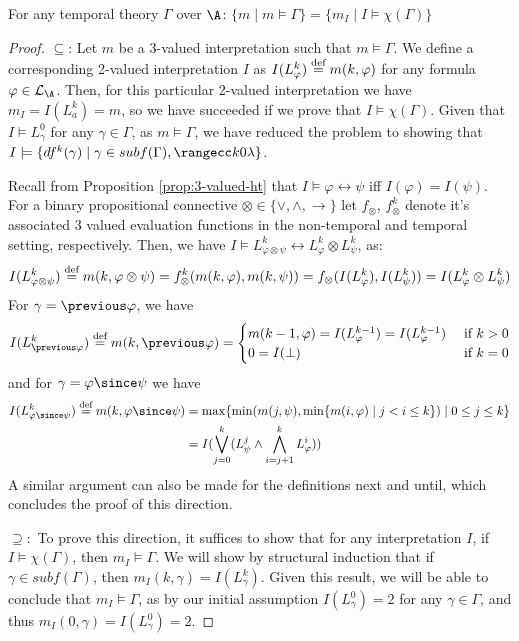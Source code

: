 \begin{theorem}\label{theorem:translation}
For any temporal theory $\Gamma$ over $\A$: \quad
$\{ m \mid m \models \Gamma \} = \{ m_I \mid I \models \chi(\Gamma) \}$
\end{theorem}
\begin{proof}
  $\subseteq$: Let $m$ be a 3-valued interpretation such that
  $m \models \Gamma$. We define a corresponding 2-valued
  interpretation $I$ as $I(L^k_\varphi) \stackrel{\text{def}}{=} m(k,\varphi)$ for any
  formula $\varphi \in \mathcal{L}_\A$. Then, for this particular
  2-valued interpretation we have $m_I=I(L_a^k)=m$, so we have
  succeeded if we prove that $I \models \chi(\Gamma)$. Given that
  $I \models L^0_\gamma$ for any $\gamma \in \Gamma$, as
  $m \models \Gamma$, we have reduced the problem to showing that
  $I \models \{ df^k(\gamma) \mid \gamma \in subf(\Gamma), \kinlambda
  \}$.

  Recall from Proposition \ref{prop:3-valued-ht} that
  $I \models \varphi \leftrightarrow \psi$ iff $I(\varphi) =
  I(\psi)$. For a binary propositional connective
  $\otimes \in \{ \vee, \wedge, \rightarrow \}$ let $f_{\otimes}$,
  $f_{\otimes}^k$ denote it's associated 3 valued evaluation functions
  in the non-temporal and temporal setting, respectively. Then, we
  have
  $I \models L^k_{\varphi \otimes \psi} \leftrightarrow L^k_\varphi
  \otimes L^k_\psi$, as:
  $$
  I(L^k_{\varphi \otimes \psi}) \stackrel{\text{def}}{=} m(k,\varphi \otimes \psi) 
  = f_{\otimes}^k(m(k,\varphi),m(k,\psi)) = f_{\otimes}(I(L^k_\varphi),I(L^k_\psi)) = I(L^k_{\varphi} \otimes L^k_{\psi})
  $$
  For $\gamma=\previous \varphi$, we have
  $$
  I(L^k_{\previous \varphi}) \defeq m(k,\previous \varphi) = \begin{cases}
    m(k-1,\varphi)=I(L^{k-1}_\varphi)=I(L^{k-1}_\varphi) &\text{ if } k > 0\\
    0=I(\bot) &\text{ if } k = 0
    \end{cases}
  $$
  and for $\gamma=\varphi \since \psi$ we have
  \begin{align*}
  I(L^k_{\varphi \since \psi}) \defeq m(k,\varphi \since \psi) &= \max \{\min (m(j, \psi), \min \{m(i, \varphi) \mid j<i \leq k\}) \mid 0 \leq j \leq k\} \\
    &= I(\bigvee_{j=0}^{k}(L_\psi^j \wedge \bigwedge_{i=j+1}^{k}L_{\varphi}^i))
  \end{align*}
  A similar argument can also be made for the definitions next and
  until, which concludes the proof of this direction.

  $\supseteq:$ To prove this direction, it suffices to show that for
  any interpretation $I$, if $I \models \chi(\Gamma)$, then
  $m_I \models \Gamma$. We will show by structural induction that if
  $\gamma \in subf(\Gamma)$, then $m_I(k,\gamma) = I(L^k_\gamma)$.
  Given this result, we will be able to conclude that
  $m_I \models \Gamma$, as by our initial assumption $I(L^0_\gamma)=2$
  for any $\gamma \in \Gamma$, and thus
  $m_I(0,\gamma)=I(L^0_\gamma)=2$.


\end{proof}
